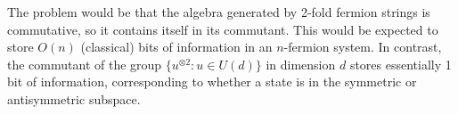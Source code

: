 The problem would be that the algebra generated by 2-fold fermion strings is commutative, so it contains itself in its commutant. This would be expected to store $O(n)$ (classical) bits of information in an $n$-fermion system. In contrast, the commutant of the group $\{u^{\otimes 2} : u \in U(d) \}$ in dimension $d$ stores essentially 1 bit of information, corresponding to whether a state is in the symmetric or antisymmetric subspace.
